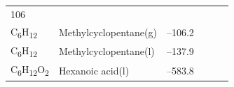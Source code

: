 \documentclass[
  9pt,
]{extbook}
\theoremstyle{definition}
\theoremstyle{definition}
\theoremstyle{definition}
\theoremstyle{remark}
\begin{document}
\begin{longtable}[]{@{}llllll@{}}
\begin{minipage}[t]{0.14\columnwidth}
106\strut
\end{minipage}\tabularnewline
\begin{minipage}[t]{0.07\columnwidth}\raggedright
C\textsubscript{6}H\textsubscript{12}\strut
\end{minipage} & \begin{minipage}[t]{0.17\columnwidth}\raggedright
Methylcyclopentane(g)\strut
\end{minipage} & \begin{minipage}[t]{0.15\columnwidth}\raggedright
--106.2\strut
\end{minipage} & \begin{minipage}[t]{0.15\columnwidth}\raggedright
\strut
\end{minipage} & \begin{minipage}[t]{0.14\columnwidth}\raggedright
\strut
\end{minipage} & \begin{minipage}[t]{0.14\columnwidth}\raggedright
\strut
\end{minipage}\tabularnewline
\begin{minipage}[t]{0.07\columnwidth}\raggedright
C\textsubscript{6}H\textsubscript{12}\strut
\end{minipage} & \begin{minipage}[t]{0.17\columnwidth}\raggedright
Methylcyclopentane(l)\strut
\end{minipage} & \begin{minipage}[t]{0.15\columnwidth}\raggedright
--137.9\strut
\end{minipage} & \begin{minipage}[t]{0.15\columnwidth}\raggedright
\strut
\end{minipage} & \begin{minipage}[t]{0.14\columnwidth}\raggedright
\strut
\end{minipage} & \begin{minipage}[t]{0.14\columnwidth}\raggedright
\strut
\end{minipage}\tabularnewline
\begin{minipage}[t]{0.07\columnwidth}\raggedright
C\textsubscript{6}H\textsubscript{12}O\textsubscript{2}\strut
\end{minipage} & \begin{minipage}[t]{0.17\columnwidth}\raggedright
Hexanoic acid(l)\strut
\end{minipage} & \begin{minipage}[t]{0.15\columnwidth}\raggedright
--583.8\strut
\end{minipage} & \begin{minipage}[t]{0.15\columnwidth}\raggedright

\end{minipage}
\end{longtable}
\end{document}
